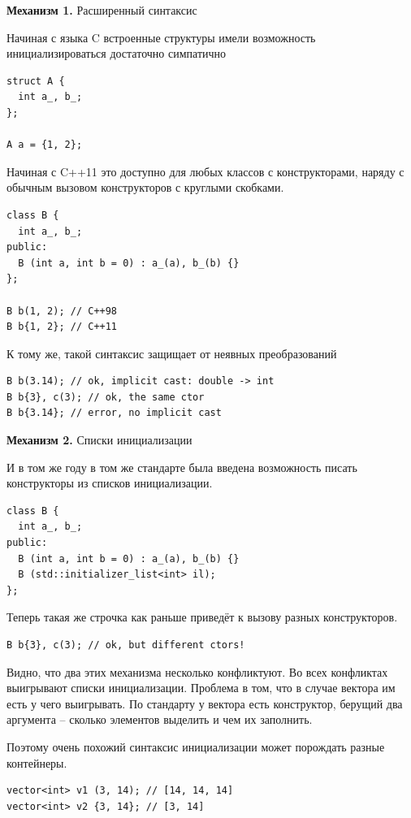 \documentclass[a4paper,12pt,oneside]{book}
\begin{document}
\textbf{Механизм 1.} Расширенный синтаксис

Начиная с языка C встроенные структуры имели возможность инициализироваться достаточно симпатично

\begin{lstlisting}
struct A {
  int a_, b_;
};

A a = {1, 2};
\end{lstlisting}

Начиная с C++11 это доступно для любых классов с конструкторами, наряду с обычным вызовом конструкторов с круглыми скобками.

\begin{lstlisting}
class B {
  int a_, b_;
public:  
  B (int a, int b = 0) : a_(a), b_(b) {}
};

B b(1, 2); // C++98
B b{1, 2}; // C++11
\end{lstlisting}

К тому же, такой синтаксис защищает от неявных преобразований

\begin{lstlisting}
B b(3.14); // ok, implicit cast: double -> int
B b{3}, c(3); // ok, the same ctor
B b{3.14}; // error, no implicit cast
\end{lstlisting}

\textbf{Механизм 2.} Списки инициализации

И в том же году в том же стандарте была введена возможность писать конструкторы из списков инициализации.

\begin{lstlisting}
class B {  
  int a_, b_;
public:  
  B (int a, int b = 0) : a_(a), b_(b) {}
  B (std::initializer_list<int> il);
};
\end{lstlisting}

Теперь такая же строчка как раньше приведёт к вызову разных конструкторов.

\begin{lstlisting}
B b{3}, c(3); // ok, but different ctors!
\end{lstlisting}

Видно, что два этих механизма несколько конфликтуют. Во всех конфликтах выигрывают списки инициализации. Проблема в том, что в случае вектора им есть у чего выигрывать. По стандарту у вектора есть конструктор, берущий два аргумента -- сколько элементов выделить и чем их заполнить.

Поэтому очень похожий синтаксис инициализации может порождать разные контейнеры.

\begin{lstlisting}
vector<int> v1 (3, 14); // [14, 14, 14]
vector<int> v2 {3, 14}; // [3, 14]
\end{lstlisting}
\end{document}
